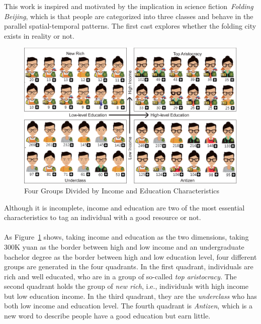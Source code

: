 
This work is inspired and motivated by the implication in science fiction~\textit{Folding Beijing}, which is that people are categorized into three classes and behave in the parallel spatial-temporal patterns. The first cast explores whether the folding city exists in reality or not.

\begin{figure}[htb!]
 \centering
 \includegraphics[width=\columnwidth]{pictures/case1_1}
 \caption{Four Groups Divided by Income and Education Characteristics}
 \label{case11}
\end{figure}

Although it is incomplete, income and education are two of the most essential characteristics to tag an individual with a good resource or not.\\
\\
As Figure~\ref{case11} shows, taking income and education as the two dimensions, taking 300K yuan as the border between high and low income and an undergraduate bachelor degree as the border between high and low education level, four different groups are generated in the four quadrants. In the first quadrant, individuals are rich and well educated, who are in a group of so-called \textit{top aristocracy}. The second quadrant holds the group of \textit{new rich}, i.e., individuals with high income but low education income. In the third quadrant, they are the \textit{underclass} who has both low income and education level. The fourth quadrant is \textit{Antizen}, which is a new word to describe people have a good education but earn little.


